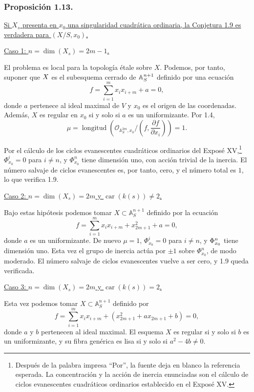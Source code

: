 \subsubsection*{Proposición 1.13.}
\underline{Si $X_s$ presenta en $x_0$ una singularidad cuadrática
ordinaria, la Conjetura 1.9 es verdadera para $(X/S,x_0)$.}

\medskip
\noindent\underline{Caso 1: $n=\dim(X_s)=2m-1$.}

El problema es local para la topología étale sobre $X$. Podemos, por
tanto, suponer que $\sisi{X_s}{X}$ es el subesquema cerrado de
$\sisi{A}{\mathbb A}_S^{n+1}$ definido por una ecuación
\[
f=\sum_{i=1}^{m}x_i x_{i+m}+a=0,
\]
donde $a$ pertenece al ideal maximal de $V$ y $x_0$ es el origen de
las coordenadas. Además, $X$ es regular en $x_0$ si y solo si $a$ es
un uniformizante. Por 1.4,
\[
\mu=\operatorname{longitud}\!\left(
\mathcal O_{\mathbb A_S^{2m},x_0}/
\left(f,\frac{\partial f}{\partial x_i}\right)\right)=1.
\]

\pageoriginale

Por el cálculo de los ciclos evanescentes cuadráticos ordinarios del
Exposé XV,\footnote{Después de la palabra impresa ``Por'', la fuente
deja en blanco la referencia esperada. La concentración y la acción de
inercia enunciadas son el cálculo de ciclos evanescentes cuadráticos
ordinarios establecido en el Exposé XV.}
$\Phi^i_{x_0}=0$ para $i\ne n$, y $\Phi^n_{x_0}$ tiene dimensión uno,
con acción trivial de la inercia. El número salvaje de ciclos
evanescentes es, por tanto, cero, y el número total es $1$, lo que
verifica 1.9.

\medskip
\noindent\underline{Caso 2: $n=\dim(X_s)=2m$ y
$\operatorname{car}(k(s))\ne2$.}

Bajo estas hipótesis podemos tomar $X\subset\mathbb A_S^{n+1}$
definido por la ecuación
\[
f=\sum_{i=1}^{m}x_i x_{i+m}+x_{2m+1}^2+a=0,
\]
donde $a$ es un uniformizante. De nuevo $\mu=1$,
$\Phi^i_{x_0}=0$ para $i\ne n$, y
$\sisi{\Phi^i_{x_0}}{\Phi^n_{x_0}}$ tiene dimensión uno. Esta vez el
grupo de inercia actúa por $\pm1$ sobre $\Phi^n_{x_0}$, de modo
moderado. El número salvaje de ciclos evanescentes vuelve a ser cero,
y 1.9 queda verificada.

\medskip
\noindent\underline{Caso 3: $n=\dim(X_s)=2m$ y
$\operatorname{car}(k(s))=2$.}

Esta vez podemos tomar $X\subset\mathbb A_S^{n+1}$ definido por
\[
f=\sum_{i=1}^{m}x_i x_{i+m}
 +(x_{2m+1}^2+a x_{2m+1}+b)=0,
\]
donde $a$ y $b$ pertenecen al ideal maximal. El esquema $X$ es regular
si y solo si $b$ es un uniformizante, y su fibra genérica es lisa si
y solo si $a^2-4b\ne0$.

